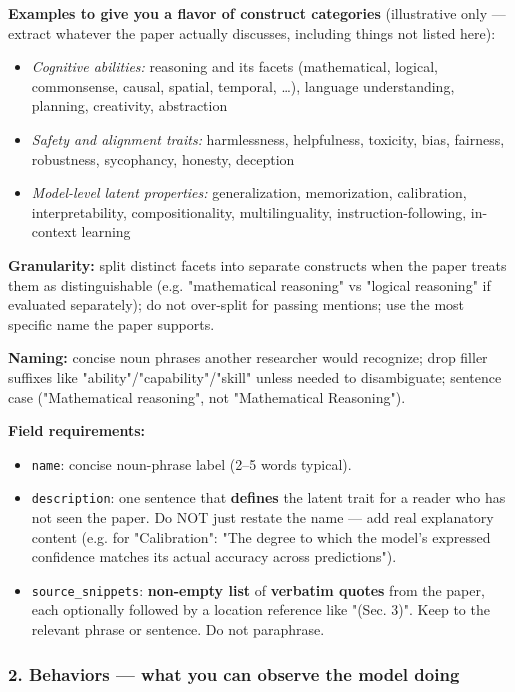 \begin{tcolorbox}[breakable,enhanced,colback=blue!3,colframe=blue!40!black,title={Prompt},fonttitle=\bfseries,left=8pt,right=8pt,top=6pt,bottom=6pt]
\textbf{Examples to give you a flavor of construct categories} (illustrative only --- extract whatever the paper actually discusses, including things not listed here):
\begin{itemize}
\item \textit{Cognitive abilities:} reasoning and its facets (mathematical, logical, commonsense, causal, spatial, temporal, \dots ), language understanding, planning, creativity, abstraction
\item \textit{Safety and alignment traits:} harmlessness, helpfulness, toxicity, bias, fairness, robustness, sycophancy, honesty, deception
\item \textit{Model-level latent properties:} generalization, memorization, calibration, interpretability, compositionality, multilinguality, instruction-following, in-context learning
\end{itemize}

\textbf{Granularity:} split distinct facets into separate constructs when the paper treats them as distinguishable (e.g. "mathematical reasoning" vs "logical reasoning" if evaluated separately); do not over-split for passing mentions; use the most specific name the paper supports.

\textbf{Naming:} concise noun phrases another researcher would recognize; drop filler suffixes like "ability"/"capability"/"skill" unless needed to disambiguate; sentence case ("Mathematical reasoning", not "Mathematical Reasoning").

\textbf{Field requirements:}
\begin{itemize}
\item \texttt{name}: concise noun-phrase label (2--5 words typical).
\item \texttt{description}: one sentence that \textbf{defines} the latent trait for a reader who has not seen the paper. Do NOT just restate the name --- add real explanatory content (e.g. for "Calibration": "The degree to which the model's expressed confidence matches its actual accuracy across predictions").
\item \texttt{source\_snippets}: \textbf{non-empty list} of \textbf{verbatim quotes} from the paper, each optionally followed by a location reference like "(Sec. 3)". Keep to the relevant phrase or sentence. Do not paraphrase.
\end{itemize}

\subsubsection*{2. Behaviors --- what you can observe the model doing}


\end{tcolorbox}

